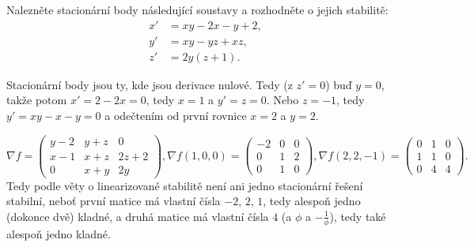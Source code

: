 \documentclass[12pt]{article}					%
\begin{document}
\pagebreak
\begin{priklad}
	Nalezněte stacionární body následující soustavy a rozhodněte o jejich stabilitě:
	\begin{align*}
		x' &= x y - 2x - y + 2,\\
		y' &= x y - y z + x z,\\
		z' &= 2y(z + 1).
	\end{align*}

	\begin{reseni}
		Stacionární body jsou ty, kde jsou derivace nulové. Tedy (z $z' = 0$) buď $y = 0$, takže potom $x' = 2 - 2x = 0$, tedy $x = 1$ a $y' = z = 0$. Nebo $z = -1$, tedy $y' = xy - x - y = 0$ a odečtením od první rovnice $x = 2$ a $y = 2$.

		$$ \nabla f = \begin{pmatrix} y - 2 & y + z & 0 \\ x - 1 & x + z & 2z + 2 \\ 0 & x + y & 2y \end{pmatrix}, \nabla f(1, 0, 0) = \begin{pmatrix} -2 & 0 & 0 \\ 0 & 1 & 2 \\ 0 & 1 & 0 \end{pmatrix}, \nabla f(2, 2, -1) = \begin{pmatrix} 0 & 1 & 0 \\ 1 & 1 & 0 \\ 0 & 4 & 4 \end{pmatrix}. $$
		Tedy podle věty o linearizované stabilitě není ani jedno stacionární řešení stabilní, neboť první matice má vlastní čísla $-2$, $2$, $1$, tedy alespoň jedno (dokonce dvě) kladné, a druhá matice má vlastní čísla $4$ (a $\phi$ a $-\frac{1}{\phi}$), tedy také alespoň jedno kladné.
	\end{reseni}
\end{priklad}
\end{document}
